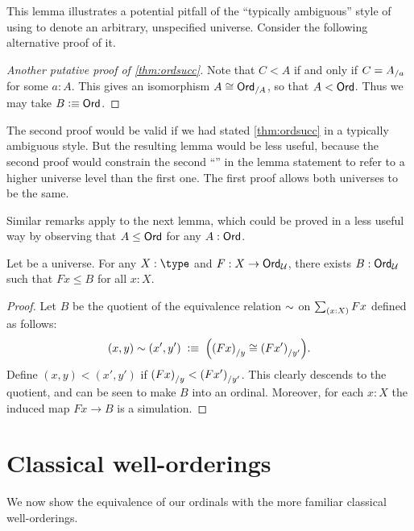 This lemma illustrates a potential pitfall of the ``typically ambiguous'' style of using \UU to denote an arbitrary, unspecified universe.
Consider the following alternative proof of it.

\begin{proof}[Another putative proof of \autoref{thm:ordsucc}]
  Note that $C<A$ if and only if $C={A}_{/a}$ for some $a:A$.
  This gives an isomorphism $A \cong {\ensuremath{\mathsf{Ord}}}_{/A}$, so that $A<\mathsf{Ord}$.
  Thus we may take $B\vcentcolon\equiv\mathsf{Ord}$.
\end{proof}

The second proof would be valid if we had stated \autoref{thm:ordsucc} in a typically ambiguous style.
But the resulting lemma would be less useful, because the second proof would constrain the second ``\ord'' in the lemma statement to refer to a higher universe level than the first one.
The first proof allows both universes to be the same.

Similar remarks apply to the next lemma, which could be proved in a less useful way by observing that $A\le \mathsf{Ord}$ for any $A:\mathsf{Ord}$.

\begin{lem}\label{thm:ordunion}
  Let \bbU be a universe.
  For any $X:\type$ and $F:X\to \mathsf{Ord}_\mathcal{U}$, there exists $B:\mathsf{Ord}_\mathcal{U}$ such that $Fx\le B$ for all $x:X$.
\end{lem}
\begin{proof}
  Let $B$ be the quotient of the equivalence relation $\sim$ on $\sm{x:X} Fx$ defined as follows:
  \[ (x,y) \sim (x',y')
  \;\vcentcolon\equiv\;
  \Big({(Fx)}_{/y} \cong {(Fx')}_{/y'}\Big).
  \]
  Define $(x,y)<(x',y')$ if ${(Fx)}_{/y} < {(Fx')}_{/y'}$.
  This clearly descends to the quotient, and can be seen to make $B$ into an ordinal.
  Moreover, for each $x:X$ the induced map $Fx\to B$ is a simulation.
\end{proof}



\section{Classical well-orderings}
\label{sec:wellorderings}

%
We now show the equivalence of our ordinals with the more familiar classical well-orderings.

